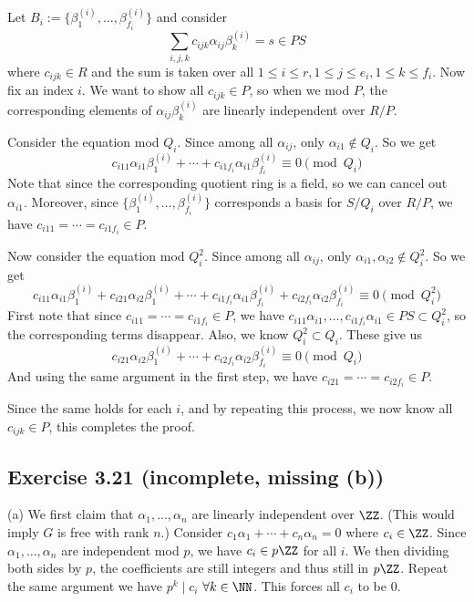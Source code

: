 \documentclass[../Chapter.tex]{subfiles}
\begin{document}
Let $B_i:=\{\beta^{(i)}_1,\ldots,\beta^{(i)}_{f_i}\}$ and consider $$\sum_{i,j,k} c_{ijk}\alpha_{ij}\beta^{(i)}_k=s\in PS$$ where $c_{ijk}\in R$ and the sum is taken over all $1\leq i\leq r,1\leq j\leq e_i,1\leq k\leq f_i$. Now fix an index $i$. We want to show all $c_{ijk}\in P$, so when we mod $P$, the corresponding elements of $\alpha_{ij}\beta^{(i)}_k$ are linearly independent over $R/P$.

Consider the equation mod $Q_i$. Since among all $\alpha_{ij}$, only $\alpha_{i1}\notin Q_i$. So we get $$c_{i11}\alpha_{i1}\beta^{(i)}_1+\cdots+c_{i1f_i}\alpha_{i1}\beta^{(i)}_{f_i}\equiv0\pmod{Q_i}$$ Note that since the corresponding quotient ring is a field, so we can cancel out $\alpha_{i1}$. Moreover, since $\{\beta^{(i)}_1,\ldots,\beta^{(i)}_{f_i}\}$ corresponds a basis for $S/Q_i$ over $R/P$, we have $c_{i11}=\cdots=c_{i1f_i}\in P$.

Now consider the equation mod $Q^2_i$. Since among all $\alpha_{ij}$, only $\alpha_{i1},\alpha_{i2}\notin Q^2_i$. So we get $$c_{i11}\alpha_{i1}\beta^{(i)}_1+c_{i21}\alpha_{i2}\beta^{(i)}_1+\cdots+c_{i1f_i}\alpha_{i1}\beta^{(i)}_{f_i}+c_{i2f_i}\alpha_{i2}\beta^{(i)}_{f_i}\equiv0\pmod{Q^2_i}$$ First note that since $c_{i11}=\cdots=c_{i1f_i}\in P$, we have $c_{i11}\alpha_{i1},\ldots,c_{i1f_i}\alpha_{i1}\in PS\subset Q^2_i$, so the corresponding terms disappear. Also, we know $Q_i^2\subset Q_i$. These give us $$c_{i21}\alpha_{i2}\beta^{(i)}_1+\cdots+c_{i2f_i}\alpha_{i2}\beta^{(i)}_{f_i}\equiv0\pmod{Q_i}$$ And using the same argument in the first step, we have $c_{i21}=\cdots=c_{i2f_i}\in P$.

Since the same holds for each $i$, and by repeating this process, we now know all $c_{ijk}\in P$, this completes the proof. 

\subsection*{Exercise 3.21 \color{red}(incomplete, missing (b))}

(a) We first claim that $\alpha_1,\ldots,\alpha_n$ are linearly independent over $\ZZ$. (This would imply $G$ is free with rank $n$.) Consider $c_1\alpha_1+\cdots+c_n\alpha_n=0$ where $c_i\in\ZZ$. Since $\alpha_1,\ldots,\alpha_n$ are independent mod $p$, we have $c_i\in p\ZZ$ for all $i$. We then dividing both sides by $p$, the coefficients are still integers and thus still in $p\ZZ$. Repeat the same argument we have $p^k\mid c_i$ $\forall k\in\NN$. This forces all $c_i$ to be 0.
\end{document}
